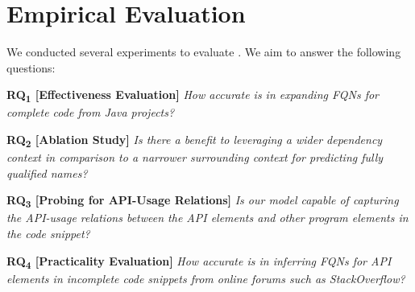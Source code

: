 \section{Empirical Evaluation}
\label{sec:evaluation}


We conducted several experiments to evaluate {\tool}. We aim to answer the following questions:

\vspace{2pt}
\noindent \textbf{RQ\textsubscript{1} 
  [Effectiveness Evaluation]} {\em How accurate is {\tool} in expanding FQNs for complete code from Java projects?}

\vspace{2pt}
\noindent \textbf{RQ\textsubscript{2} 
[Ablation Study]}  {\em Is there a benefit to leveraging a wider dependency context in comparison to a narrower surrounding context for predicting fully qualified names?}

\vspace{2pt}
\noindent \textbf{RQ\textsubscript{3} [Probing for API-Usage Relations]} {\em Is our model capable of capturing the API-usage relations between the API elements and other program elements in the code snippet?}

\vspace{2pt}
\noindent \textbf{RQ\textsubscript{4} 
[Practicality Evaluation]}  {\em How accurate is {\tool} in 
inferring FQNs for API elements in incomplete code snippets from online forums such as StackOverflow?}

%
